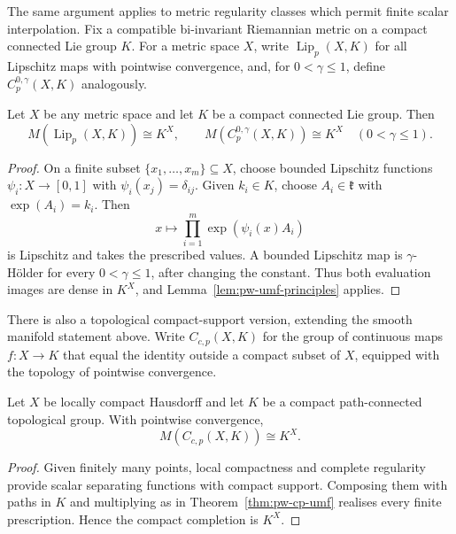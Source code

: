 The same argument applies to metric regularity classes which permit finite
scalar interpolation. Fix a compatible bi-invariant Riemannian metric on a
compact connected Lie group \(K\). For a metric space \(X\), write
\(\operatorname{Lip}_p(X,K)\) for all Lipschitz maps with pointwise
convergence, and, for \(0<\gamma\leq1\), define
\(C_p^{0,\gamma}(X,K)\) analogously.

\begin{corollary}\label{cor:pw-lipschitz-mapping-umf}
Let \(X\) be any metric space and let \(K\) be a compact connected Lie group.
Then
\[
 M(\operatorname{Lip}_p(X,K))\cong K^X,
 \qquad
 M(C_p^{0,\gamma}(X,K))\cong K^X
 \quad(0<\gamma\leq1).
\]
\end{corollary}

\begin{proof}
On a finite subset \(\{x_1,\ldots,x_m\}\subseteq X\), choose bounded
Lipschitz functions \(\psi_i:X\to[0,1]\) with
\(\psi_i(x_j)=\delta_{ij}\). Given \(k_i\in K\), choose
\(A_i\in\mathfrak k\) with \(\exp(A_i)=k_i\). Then
\[
 x\longmapsto\prod_{i=1}^m\exp(\psi_i(x)A_i)
\]
is Lipschitz and takes the prescribed values. A bounded Lipschitz map is
\(\gamma\)-H\"older for every \(0<\gamma\leq1\), after changing the constant.
Thus both evaluation images are dense in \(K^X\), and
Lemma~\ref{lem:pw-umf-principles} applies.
\end{proof}

There is also a topological compact-support version, extending the smooth
manifold statement above.  Write \(C_{c,p}(X,K)\) for the group of continuous
maps \(f:X\to K\) that equal the identity outside a compact subset of \(X\),
equipped with the topology of pointwise convergence.

\begin{corollary}\label{cor:pw-lch-compact-support-umf}
Let \(X\) be locally compact Hausdorff and let \(K\) be a compact
path-connected topological group. With pointwise convergence,
\[
 M(C_{c,p}(X,K))\cong K^X.
\]
\end{corollary}

\begin{proof}
Given finitely many points, local compactness and complete regularity provide
scalar separating functions with compact support. Composing them with paths
in \(K\) and multiplying as in Theorem~\ref{thm:pw-cp-umf} realises every finite
prescription. Hence the compact completion is \(K^X\).
\end{proof}

